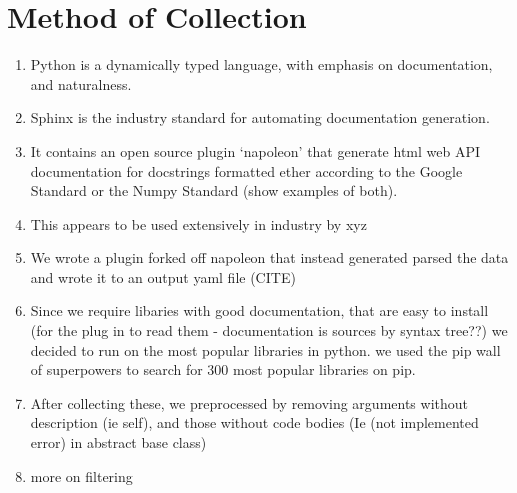 \section{Method of Collection} %
\label{sec:method_of_collection}

\begin{enumerate}
    \item Python is a dynamically typed language, with emphasis on documentation, and naturalness.
    \item Sphinx is the industry standard for automating documentation generation.
    \item It contains an open source plugin `napoleon' that generate html web API documentation for docstrings formatted ether according to the Google Standard or the Numpy Standard (show examples of both).
    \item This appears to be used extensively in industry by xyz
    \item We wrote a plugin forked off napoleon that instead generated parsed the data and wrote it to an output yaml file (CITE)
    \item Since we require libaries with good documentation, that are easy to install (for the plug in to read them - documentation is sources by syntax tree??) we decided to run on the most popular libraries in python. we used the pip wall of superpowers to search for 300 most popular libraries on pip.
    \item After collecting these, we preprocessed by removing arguments without description (ie self), and those without code bodies (Ie (not implemented error) in abstract base class)
    \item more on filtering
\end{enumerate}





